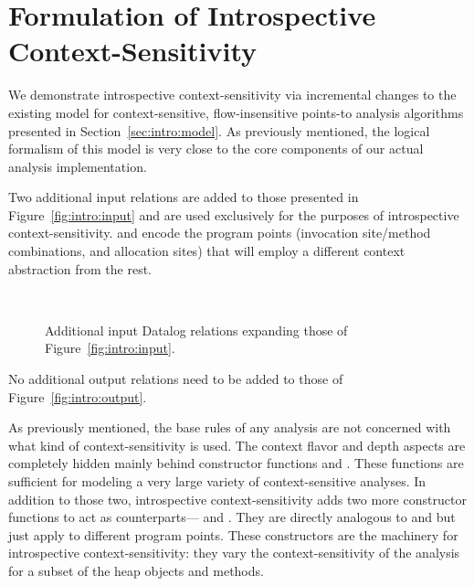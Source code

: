 \section{Formulation of Introspective Context-Sensitivity}
\label{sec:introspect:model}

We demonstrate introspective context-sensitivity via incremental changes to the existing model for context-sensitive, flow-insensitive points-to analysis algorithms presented in Section~\ref{sec:intro:model}. As previously mentioned, the logical formalism of this model is very close to the core components of our actual analysis implementation.

Two additional input relations are added to those presented in Figure~\ref{fig:intro:input} and are used exclusively for the purposes of introspective context-sensitivity.  and  encode the program points (invocation site/method combinations, and allocation sites) that will employ a different context abstraction from the rest.

\begin{figure}[hb]
\begin{datalog}
 \\ 
\end{datalog}
\caption[]{Additional input Datalog relations expanding those of Figure~\ref{fig:intro:input}.}
\label{fig:introspect:input}
\end{figure}

No additional output relations need to be added to those of Figure~\ref{fig:intro:output}.

As previously mentioned, the base rules of any analysis are not concerned with what kind of context-sensitivity is used. The context flavor and depth aspects are completely hidden mainly behind constructor functions  and . These functions are sufficient for modeling a very large variety of context-sensitive analyses. In addition to those two, introspective context-sensitivity adds two more constructor functions to act as counterparts--- and . They are directly analogous to  and  but just apply to different program points. These constructors are the machinery for introspective context-sensitivity: they vary the context-sensitivity of the analysis for a subset of the heap objects and methods.


